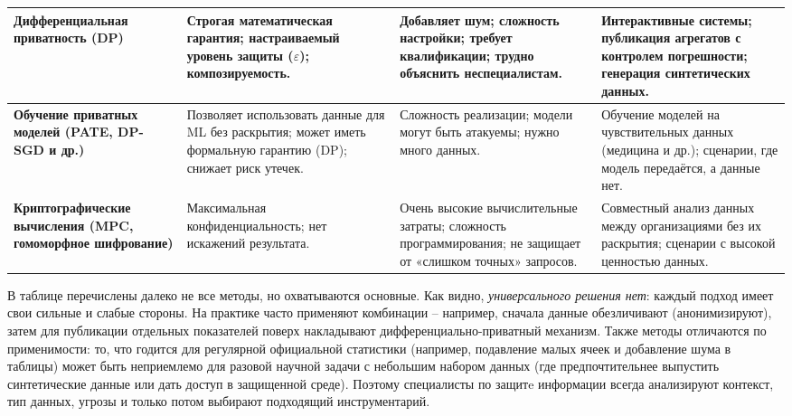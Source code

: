 \begin{table}[H]
{\begin{tabular}{|p{3.4cm}|p{4.8cm}|p{4.8cm}|p{3.8cm}|}
    \textbf{Дифференциальная приватность (DP)} &
    Строгая математическая гарантия; настраиваемый уровень защиты ($\varepsilon$); композируемость. &
    Добавляет шум; сложность настройки; требует квалификации; трудно объяснить неспециалистам. &
    Интерактивные системы; публикация агрегатов с контролем погрешности; генерация синтетических данных. \\ \hline
    
    \textbf{Обучение приватных моделей (PATE, DP-SGD и др.)} &
    Позволяет использовать данные для ML без раскрытия; может иметь формальную гарантию (DP); снижает риск утечек. &
    Сложность реализации; модели могут быть атакуемы; нужно много данных. &
    Обучение моделей на чувствительных данных (медицина и др.); сценарии, где модель передаётся, а данные нет. \\ \hline
    
    \textbf{Криптографические вычисления (MPC, гомоморфное шифрование)} &
    Максимальная конфиденциальность; нет искажений результата. &
    Очень высокие вычислительные затраты; сложность программирования; не защищает от «слишком точных» запросов. &
    Совместный анализ данных между организациями без их раскрытия; сценарии с высокой ценностью данных. \\ \hline
    
    \end{tabular}%
    }
\end{table} 
В таблице перечислены далеко не все методы, но охватываются основные. Как видно, \textit{универсального решения нет}:
каждый подход имеет свои сильные и слабые стороны. На практике часто применяют
комбинации – например, сначала данные обезличивают (анонимизируют), затем для публикации отдельных показателей поверх
накладывают дифференциально-приватный механизм. Также методы отличаются по применимости: то, что годится для регулярной
официальной статистики (например, подавление малых ячеек и добавление шума в таблицы) может быть неприемлемо для разовой
научной задачи с небольшим набором данных (где предпочтительнее выпустить синтетические данные или дать доступ в
защищенной среде). Поэтому специалисты по защитe информации всегда анализируют контекст, тип данных, угрозы и только
потом выбирают подходящий инструментарий.

